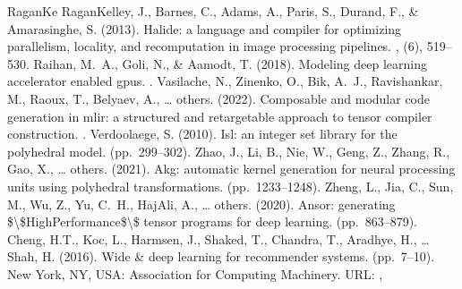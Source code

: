 \documentclass[letterpaper,10pt,english]{sphinxmanual}
\begin{document}
\begin{sphinxthebibliography}{Ragan\sphinxhyphen{}Ke}
\sphinxAtStartPar
Ragan\sphinxhyphen{}Kelley, J., Barnes, C., Adams, A., Paris, S., Durand, F., \& Amarasinghe, S. (2013). Halide: a language and compiler for optimizing parallelism, locality, and recomputation in image processing pipelines. , (6), 519–530.
\sphinxAtStartPar
Raihan, M. A., Goli, N., \& Aamodt, T. (2018). Modeling deep learning accelerator enabled gpus. .
\sphinxAtStartPar
Vasilache, N., Zinenko, O., Bik, A. J., Ravishankar, M., Raoux, T., Belyaev, A., … others. (2022). Composable and modular code generation in mlir: a structured and retargetable approach to tensor compiler construction. .
\sphinxAtStartPar
Verdoolaege, S. (2010). Isl: an integer set library for the polyhedral model.  (pp. 299–302).
\sphinxAtStartPar
Zhao, J., Li, B., Nie, W., Geng, Z., Zhang, R., Gao, X., … others. (2021). Akg: automatic kernel generation for neural processing units using polyhedral transformations.  (pp. 1233–1248).
\sphinxAtStartPar
Zheng, L., Jia, C., Sun, M., Wu, Z., Yu, C. H., Haj\sphinxhyphen{}Ali, A., … others. (2020). Ansor: generating \$\textbackslash{}\$High\sphinxhyphen{}Performance\$\textbackslash{}\$ tensor programs for deep learning.  (pp. 863–879).
\sphinxAtStartPar
Cheng, H.\sphinxhyphen{}T., Koc, L., Harmsen, J., Shaked, T., Chandra, T., Aradhye, H., … Shah, H. (2016). Wide \& deep learning for recommender systems.  (pp. 7–10). New York, NY, USA: Association for Computing Machinery. URL: , %

\end{sphinxthebibliography}
\end{document}
